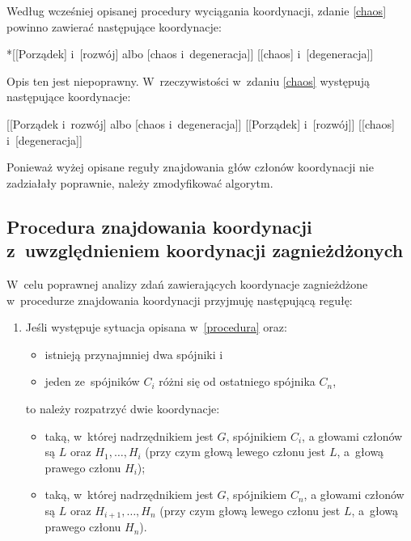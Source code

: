 Według wcześniej opisanej procedury wyciągania koordynacji, zdanie \eqref{chaos} powinno zawierać następujące koordynacje:

\begin{exe}
\ex \label{chaos-źle-1}
{*[[Porządek] i~[rozwój] albo [chaos i~degeneracja]]}
\ex \label{chaos-źle-2}
{[[chaos] i~[degeneracja]]}
\end{exe}

Opis ten jest niepoprawny. W~rzeczywistości  w~zdaniu \eqref{chaos} występują następujące koordynacje:

\begin{exe}
\ex \label{chaos-1}
{[[Porządek i~rozwój] albo [chaos i~degeneracja]]}
\ex \label{chaos-2}
{[[Porządek] i~[rozwój]]}
\ex \label{chaos-3}
{[[chaos] i~[degeneracja]]}
\end{exe}

Ponieważ wyżej opisane reguły znajdowania głów członów koordynacji nie zadziałały poprawnie, należy zmodyfikować algorytm.

\subsection{Procedura znajdowania koordynacji z~uwzględnieniem koordynacji zagnieżdżonych} \label{zagnieżdżone}

W~celu poprawnej analizy zdań zawierających koordynacje zagnieżdżone w~procedurze znajdowania koordynacji przyjmuję następującą regułę:

\begin{enumerate}
\item[\namedlabel{H6}{(H6)}] %
Jeśli występuje sytuacja opisana w~\eqref{procedura} oraz:

\begin{itemize}
\item istnieją przynajmniej dwa spójniki i
\item jeden ze~spójników $C_{i}$ różni się od ostatniego spójnika $C_{n}$,
\end{itemize}

to należy rozpatrzyć dwie koordynacje:

\begin{itemize}
\item taką, w~której nadrzędnikiem jest $G$, spójnikiem $C_{i}$, a głowami członów są $L$ oraz $H_{1}, \ldots , H_{i}$ (przy czym głową lewego członu jest $L$, a~głową prawego członu $H_{i}$);
\item taką, w~której nadrzędnikiem jest $G$, spójnikiem $C_{n}$, a głowami członów są $L$ oraz $H_{i+1}, \ldots , H_{n}$ (przy czym głową lewego członu jest $L$, a~głową prawego członu $H_{n}$).
\end{itemize} 
\end{enumerate}

